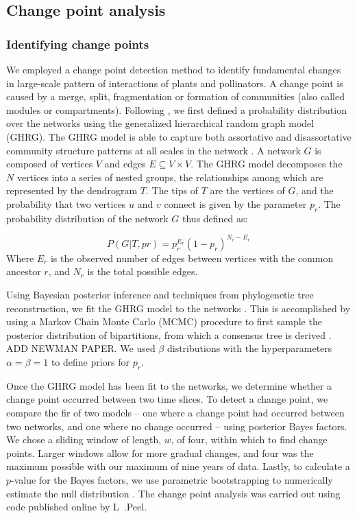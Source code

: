 \documentclass[12pt]{article}
\begin{document}
\subsection*{Change point analysis}
\subsubsection*{Identifying change points}
We employed a change point detection method \citep{peel2014detecting}
to identify fundamental changes in large-scale pattern of interactions
of plants and pollinators. A change point is caused by a merge, split,
fragmentation or formation of communities (also called modules or
compartments). Following \cite{peel2014detecting}, we first defined a
probability distribution over the networks using the generalized
hierarchical random graph model (GHRG). The GHRG model is able to
capture both assortative and disassortative community structure
patterns at all scales in the network \citep{peel2014detecting}. A
network $G$ is composed of vertices $V$ and edges $E \subseteq {V × V
}$. The GHRG model decomposes the $N$ vertices into a series of nested
groups, the relationships among which are represented by the
dendrogram $T$.  The tips of $T$ are the vertices of $G$, and the
probability that two vertices $u$ and $v$ connect is given by the
parameter $p_r$. The probability distribution of the network $G$ thus
defined as:

\begin{equation}
    \label{eq:lik}
    P(G|T,{pr}) = p_r^{E_r}(1-p_r)^{N_r-E_r}
\end{equation}
% 
Where $E_r$ is the observed number of edges between vertices with the
common ancestor $r$, and $N_r$ is the total possible edges. 

Using Bayesian posterior inference and techniques from phylogenetic
tree reconstruction, we fit the GHRG model to the networks
\citep{peel2014detecting}. This is accomplished by using a Markov
Chain Monte Carlo (MCMC) procedure to first sample the posterior
distribution of bipartitions, from which a consensus tree is derived
\citep{peel2014detecting}. ADD NEWMAN PAPER. We used $\beta$
distributions with the hyperparameters $\alpha=\beta=1$ to define
priors for $p_r$.

Once the GHRG model has been fit to the networks, we determine whether
a change point occurred between two time slices. To detect a change
point, we compare the fir of two models -- one where a change point
had occurred between two networks, and one where no change occurred --
using posterior Bayes factors. We chose a sliding window of length,
$w$, of four, within which to find change points. Larger windows allow
for more gradual changes, and four was the maximum possible with our
maximum of nine years of data. Lastly, to calculate a $p$-value for
the Bayes factors, we use parametric bootstrapping to numerically
estimate the null distribution \citep{peel2014detecting}. The change
point analysis was carried out using code published online by L~.Peel.
\end{document}
